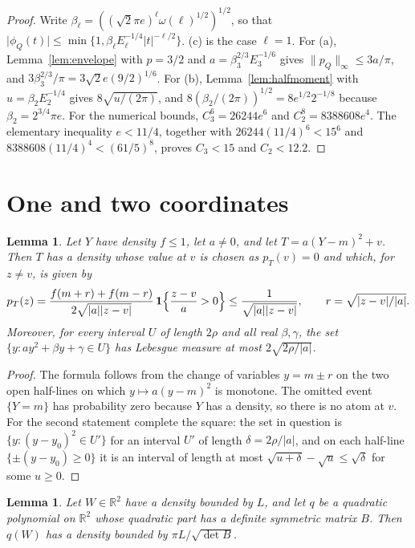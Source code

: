 \documentclass[11pt]{amsart}
\numberwithin{equation}{section}
\newtheorem{lemma}[theorem]{Lemma}
\theoremstyle{definition}
\theoremstyle{remark}
\newcommand{\R}{\mathbb R}
\newcommand{\1}{\mathbf 1}
\newcommand{\norm}[1]{\lVert #1\rVert}
\newcommand{\abs}[1]{\lvert #1\rvert}
\begin{document}
\begin{proof}
Write $\beta_\ell=((\sqrt2\pi e)^\ell \omega(\ell)^{1/2})^{1/2}$, so that $\abs{\phi_Q(t)}\le\min\{1,\beta_\ell E_\ell^{-1/4}\abs t^{-\ell/2}\}$. (c) is the case $\ell=1$. For (a), Lemma~\ref{lem:envelope} with $p=3/2$ and $a=\beta_3^{2/3}E_3^{-1/6}$ gives $\norm{p_Q}_\infty\le3a/\pi$, and $3\beta_3^{2/3}/\pi=3\sqrt2e(9/2)^{1/6}$. For (b), Lemma~\ref{lem:halfmoment} with $u=\beta_2E_2^{-1/4}$ gives $8\sqrt{u/(2\pi)}$, and $8(\beta_2/(2\pi))^{1/2}=8e^{1/2}2^{-1/8}$ because $\beta_2=2^{3/4}\pi e$. For the numerical bounds, $C_3^6=26244e^6$ and $C_2^8=8388608e^4$. The elementary inequality $e<11/4$, together with $26244(11/4)^6<15^6$ and $8388608(11/4)^4<(61/5)^8$, proves $C_3<15$ and $C_2<12.2$.
\end{proof}

\section{One and two coordinates}\label{sec:pivots}

\begin{lemma}\label{lem:square}
Let $Y$ have density $f\le1$, let $a\ne0$, and let $T=a(Y-m)^2+v$. Then $T$ has a density whose value at $v$ is chosen as $p_T(v)=0$ and which, for $z\ne v$, is given by
\[
p_T(z)=\frac{f(m+r)+f(m-r)}{2\sqrt{\abs a\abs{z-v}}}\,\1\Bigl\{\frac{z-v}{a}>0\Bigr\}\le\frac1{\sqrt{\abs a\abs{z-v}}},\qquad r=\sqrt{\abs{z-v}/\abs a}.
\]
Moreover, for every interval $U$ of length $2\rho$ and all real $\beta,\gamma$, the set $\{y:ay^2+\beta y+\gamma\in U\}$ has Lebesgue measure at most $2\sqrt{2\rho/\abs a}$.
\end{lemma}

\begin{proof}
The formula follows from the change of variables $y=m\pm r$ on the two open half-lines on which $y\mapsto a(y-m)^2$ is monotone. The omitted event $\{Y=m\}$ has probability zero because $Y$ has a density, so there is no atom at $v$. For the second statement complete the square: the set in question is $\{y:(y-y_0)^2\in U'\}$ for an interval $U'$ of length $\delta=2\rho/\abs a$, and on each half-line $\{\pm(y-y_0)\ge0\}$ it is an interval of length at most $\sqrt{u+\delta}-\sqrt u\le\sqrt\delta$ for some $u\ge0$.
\end{proof}

\begin{lemma}\label{lem:definite}
Let $W\in\R^2$ have a density bounded by $L$, and let $q$ be a quadratic polynomial on $\R^2$ whose quadratic part has a definite symmetric matrix $B$. Then $q(W)$ has a density bounded by $\pi L/\sqrt{\det B}$.
\end{lemma}
\end{document}

